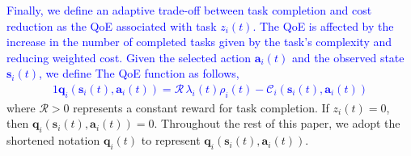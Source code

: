 \documentclass[10pt, journal,letterpaper]{IEEEtran}
\begin{document}
\textcolor{blue}{Finally, we define an adaptive trade-off between task completion and cost reduction as the QoE associated with task $z_i(t)$. The QoE is affected by the increase in the number of completed tasks given by the task's complexity and reducing weighted cost. Given the selected action $\boldsymbol{a}_i(t)$ and the observed state $\boldsymbol{s}_i(t)$, we define The QoE function as follows,
\begin{alignat}{1}
\boldsymbol{q}_i(\boldsymbol{s}_i(t),\boldsymbol{a}_i(t)) = 	\mathcal{R}\, \lambda_i(t) \rho_i(t) - \mathcal{C}_i(\boldsymbol{s}_i(t),\boldsymbol{a}_i(t))
\end{alignat}}
where $\mathcal{R} > 0$ represents a constant reward for task completion. If $z_i(t) = 0$, then $\boldsymbol{q}_i(\boldsymbol{s}_i(t), \boldsymbol{a}_i(t)) = 0$. Throughout the rest of this paper, we adopt the shortened notation $\boldsymbol{q}_i(t)$ to represent $\boldsymbol{q}_i(\boldsymbol{s}_i(t), \boldsymbol{a}_i(t))$.
\end{document}
